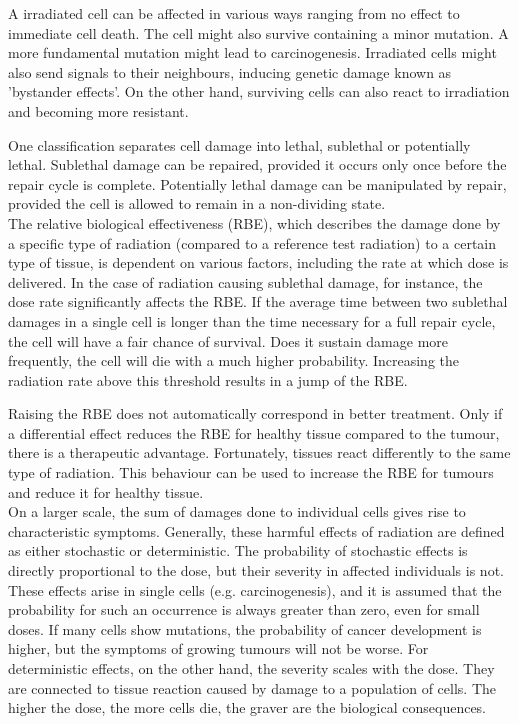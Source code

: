 A irradiated cell can be affected in various ways ranging from no effect to immediate cell death.
The cell might also survive containing a minor mutation.
A more fundamental mutation might lead to carcinogenesis.
Irradiated cells might also send signals to their neighbours, inducing genetic damage known as 'bystander effects'.
On the other hand, surviving cells can also react to irradiation and becoming more resistant.

One classification separates cell damage into lethal, sublethal or potentially lethal.
Sublethal damage can be repaired, provided it occurs only once before the repair cycle is complete.
Potentially lethal damage can be manipulated by repair, provided the cell is allowed to remain in a non-dividing state.\\

The relative biological effectiveness (RBE), which describes the damage done by a specific type of radiation (compared to a reference test radiation) to a certain type of tissue, is dependent on various factors, including the rate at which dose is delivered.
In the case of radiation causing sublethal damage, for instance, the dose rate significantly affects the RBE.
If the average time between two sublethal damages in a single cell is longer than the time necessary for a full repair cycle, the cell will have a fair chance of survival.
Does it sustain damage more frequently, the cell will die with a much higher probability.
Increasing the radiation rate above this threshold results in a jump of the RBE.

Raising the RBE does not automatically correspond in better treatment.
Only if a differential effect reduces the RBE for healthy tissue compared to the tumour, there is a therapeutic advantage.
Fortunately, tissues react differently to the same type of radiation.
This behaviour can be used to increase the RBE for tumours and reduce it for healthy tissue.\\

On a larger scale, the sum of damages done to individual cells gives rise to characteristic symptoms.
Generally, these harmful effects of radiation are defined as either stochastic or deterministic.
The probability of stochastic effects is directly proportional to the dose, but their severity in affected individuals is not.
These effects arise in single cells (e.g. carcinogenesis), and it is assumed that the probability for such an occurrence is always greater than zero, even for small doses.
If many cells show mutations, the probability of cancer development is higher, but the symptoms of growing tumours will not be worse.
For deterministic effects, on the other hand, the severity scales with the dose.
They are connected to tissue reaction caused by damage to a population of cells.
The higher the dose, the more cells die, the graver are the biological consequences.

